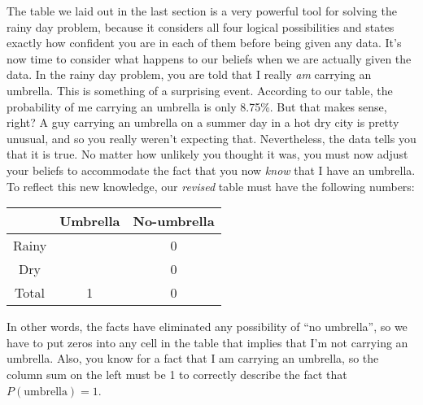 
The table we laid out in the last section is a very powerful tool for solving the rainy day problem, because it considers all four logical possibilities and states exactly how confident you are in each of them before being given any data. It's now time to consider what happens to our beliefs when we are actually given the data. In the rainy day problem, you are told that I really {\it am} carrying an umbrella. This is something of a surprising event. According to our table, the probability of me carrying an umbrella is only 8.75\%. But that makes sense, right? A guy carrying an umbrella on a summer day in a hot dry city is pretty unusual, and so you really weren't expecting that. Nevertheless, the data tells you that it is true. No matter how unlikely you thought it was, you must now adjust your beliefs to accommodate the fact that you now {\it know} that I have an umbrella. To reflect this new knowledge, our {\it revised} table must have the following numbers:
\begin{center}
\begin{tabular}{c|cc}
& Umbrella & No-umbrella  \\ \hline
Rainy &  & 0   \\
Dry &  & 0    \\ \hline
Total & 1 & 0 
\end{tabular}
\end{center}
In other words, the facts have eliminated any possibility of ``no umbrella'', so we have to put zeros into any cell in the table that implies that I'm not carrying an umbrella. Also, you know for a fact that I am carrying an umbrella, so the column sum on the left must be 1 to correctly describe the fact that $P(\mbox{umbrella})=1$.

